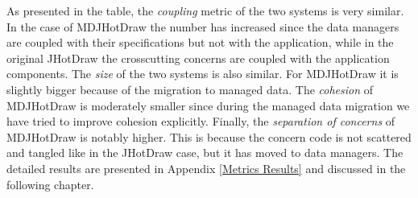 \begin{table} [H]
\caption{Metrics}
\label{tbl:metrics}
\end{table}

As presented in the table, the \textit{coupling} metric of the two systems is very similar. 
In the case of MDJHotDraw the number has increased since the data managers are coupled with their specifications but not with the application, while in the original JHotDraw the crosscutting concerns are coupled with the application components.
The \textit{size} of the two systems is also similar. 
For MDJHotDraw it is slightly bigger because of the migration to managed data.
The \textit{cohesion} of MDJHotDraw is moderately smaller since during the managed data migration we have tried to improve cohesion explicitly.
Finally, the \textit{separation of concerns} of MDJHotDraw is notably higher.
This is because the concern code is not scattered and tangled like in the JHotDraw case, but it has moved to data managers.
The detailed results are presented in Appendix \ref{Metrics Results} and discussed in the following chapter.
